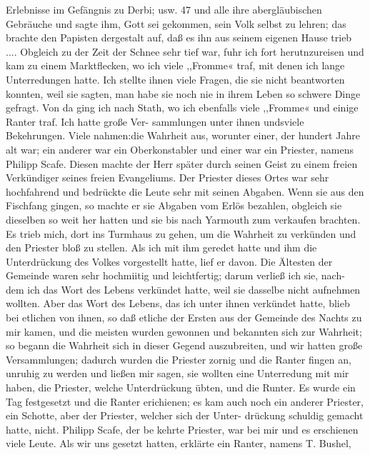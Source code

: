 Erlebnisse im Gefängnis zu Derbi; usw. 47
und alle ihre abergläubischen Gebräuche und sagte ihm, Gott sei
gekommen, sein Volk selbst zu lehren; das brachte den Papisten
dergestalt auf, daß es ihn aus seinem eigenen Hause trieb ....
Obgleich zu der Zeit der Schnee sehr tief war, fuhr ich fort
herutnzureisen und kam zu einem Marktflecken, wo ich viele
,,Fromme« traf, mit denen ich lange Unterredungen hatte. Ich
stellte ihnen viele Fragen, die sie nicht beantworten konnten, weil
sie sagten, man habe sie noch nie in ihrem Leben so schwere
Dinge gefragt. Von da ging ich nach Stath, wo ich ebenfalls
viele ,,Fromme« und einige Ranter traf. Ich hatte große Ver-
sammlungen unter ihnen undsviele Bekehrungen. Viele nahmen:die
Wahrheit aus, worunter einer, der hundert Jahre alt war; ein
anderer war ein Oberkonstabler und einer war ein Priester, namens
Philipp Scafe. Diesen machte der Herr später durch seinen Geist
zu einem freien Verkündiger seines freien Evangeliums.
Der Priester dieses Ortes war sehr hochfahrend und bedrückte
die Leute sehr mit seinen Abgaben. Wenn sie aus den Fischfang
gingen, so machte er sie Abgaben vom Erlös bezahlen, obgleich
sie dieselben so weit her hatten und sie bis nach Yarmouth zum
verkaufen brachten. Es trieb mich, dort ins Turmhaus zu gehen,
um die Wahrheit zu verkünden und den Priester bloß zu stellen.
Als ich mit ihm geredet hatte und ihm die Unterdrückung des
Volkes vorgestellt hatte, lief er davon. Die Ältesten der Gemeinde
waren sehr hochmiitig und leichtfertig; darum verließ ich sie, nach-
dem ich das Wort des Lebens verkündet hatte, weil sie dasselbe
nicht aufnehmen wollten. Aber das Wort des Lebens, das ich
unter ihnen verkündet hatte, blieb bei etlichen von ihnen, so daß
etliche der Ersten aus der Gemeinde des Nachts zu mir kamen,
und die meisten wurden gewonnen und bekannten sich zur Wahrheit;
so begann die Wahrheit sich in dieser Gegend auszubreiten, und
wir hatten große Versammlungen; dadurch wurden die Priester
zornig und die Ranter fingen an, unruhig zu werden und ließen
mir sagen, sie wollten eine Unterredung mit mir haben, die Priester,
welche Unterdrückung übten, und die Runter. Es wurde ein Tag
festgesetzt und die Ranter erichienen; es kam auch noch ein anderer
Priester, ein Schotte, aber der Priester, welcher sich der Unter-
drückung schuldig gemacht hatte, nicht. Philipp Scafe, der be
kehrte Priester, war bei mir und es erschienen viele Leute. Als
wir uns gesetzt hatten, erklärte ein Ranter, namens T. Bushel,


